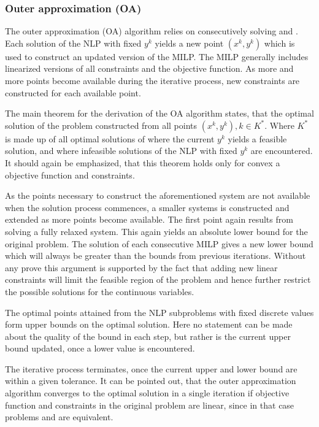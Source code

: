         \subsubsection{Outer approximation (OA)}
        The outer approximation (OA) algorithm relies on consecutively solving  and
        . Each solution of the NLP with fixed $y^k$ yields a new point $(x^k,y^k)$ which is used to
        construct an updated version of the MILP. The MILP generally includes linearized versions of all constraints and
        the objective function. As more and more points become available during the iterative process, new constraints
        are constructed for each available point.

        The main theorem for the derivation of the OA algorithm states, that the optimal solution of the problem
         constructed from all points $(x^k,y^k), k \in K^{\ast}$. Where $K^{\ast}$ is made up of
        all optimal solutions of  where the current $y^k$ yields a feasible solution, and
         where infeasible solutions of the NLP with fixed $y^k$ are encountered. It should
        again be emphasized, that this theorem holds only for convex a objective function and constraints.

        As the points necessary to construct the aforementioned system are not available when the solution process
        commences, a smaller systems is constructed and extended as more points become available. The first point again
        results from solving a fully relaxed system.  This again yields an absolute lower bound for the original problem. The solution of each consecutive
        MILP gives a new lower bound which will always be greater than the bounds from previous iterations. Without any
        prove this argument is supported by the fact that adding new linear constraints will limit the feasible region of
        the problem and hence further restrict the possible solutions for the continuous variables.

        The optimal points attained from the NLP subproblems with fixed discrete values form upper bounds on the optimal
        solution. Here no statement can be made about the quality of the bound in each step, but rather is the current
        upper bound updated, once a lower value is encountered.

        The iterative process terminates, once the current upper and lower bound are within a given tolerance. It can be
        pointed out, that the outer approximation algorithm converges to the optimal solution in a single iteration if
        objective function and constraints in the original problem are linear, since in that case problems
         and  are equivalent.

